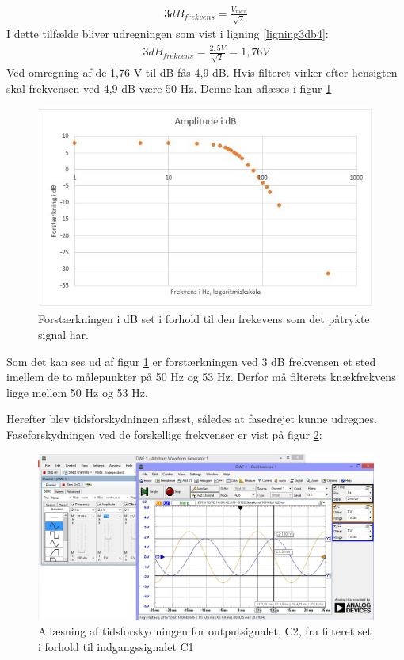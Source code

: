\begin{align}
3dB_{frekvens}=\frac{V_{max}}{\sqrt{2}}
\label{ligning3db}
\end{align}
I dette tilfælde bliver udregningen som vist i ligning \ref{ligning3db4}:\\
\begin{align}
	3dB_{frekvens}=\frac{2,5V}{\sqrt{2}}=1,76V
	\label{ligning3db4}
\end{align}
Ved omregning af de 1,76 V til dB fås 4,9 dB. Hvis filteret virker efter hensigten skal frekvensen ved 4,9 dB være 50 Hz. Denne kan aflæses i figur \ref{fig:AmplitudedBFilter}

\begin{figure}[H]
	\centering
	\includegraphics[width=1\textwidth]{Figurer/Hardware/AmpdBFilter}
	\caption{Forstærkningen i dB set i forhold til den frekevens som det påtrykte signal har.}
	\label{fig:AmplitudedBFilter}
\end{figure}

Som det kan ses ud af figur \ref{fig:AmplitudedBFilter} er forstærkningen ved 3 dB frekvensen et sted imellem de to målepunkter på 50 Hz og 53 Hz. Derfor må filterets knækfrekvens ligge mellem 50 Hz og 53 Hz.

Herefter blev tidsforskydningen aflæst, således at fasedrejet kunne udregnes. Faseforskydningen ved de forskellige frekvenser er vist på figur \ref{fig:FilterTidsforskydning}:

\begin{figure}[H]
	\centering
	\includegraphics[width=1\textwidth]{Figurer/Hardware/AnalogScreenFilter}
	\caption{Aflæsning af tidsforskydningen for outputsignalet, C2, fra filteret set i forhold til indgangssignalet C1}
	\label{fig:FilterTidsforskydning}
\end{figure}

